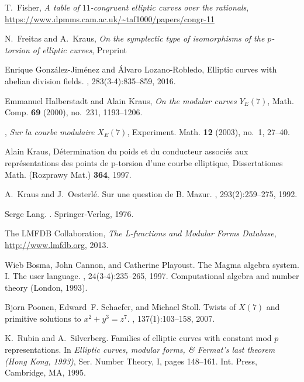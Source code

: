 \documentclass[12pt]{amsart}
\numberwithin{equation}{section}
\theoremstyle{definition}
\theoremstyle{remark}
\begin{document}
\begin{thebibliography}{999}
 T.\ Fisher,
{\em A table of $11$-congruent elliptic curves over the rationals}, \\
\url{https://www.dpmms.cam.ac.uk/~taf1000/papers/congr-11}

 N.\ Freitas and A.\ Kraus,
{\em On the symplectic type of isomorphisms of the $p$-torsion of elliptic curves}, Preprint

Enrique Gonz\'{a}lez-Jim\'{e}nez and \'{A}lvaro Lozano-Robledo,
\newblock Elliptic curves with abelian division fields.
, 283(3-4):835--859, 2016.

Emmanuel Halberstadt and Alain Kraus, \emph{On the modular curves {$Y_E(7)$}},
  Math. Comp. \textbf{69} (2000), no.~231, 1193--1206. 

\bysame, \emph{Sur la courbe modulaire {$X_E(7)$}}, Experiment. Math.
  {\bf 12} (2003), no.~1, 27--40. 
  
Alain Kraus,
\newblock D{\'e}termination du poids et du conducteur associ{\'e}s aux repr{\'e}sentations des points de p-torsion d'une courbe elliptique,
\newblock Dissertationes Math. (Rozprawy Mat.) {\bf 364}, 1997.


A.~Kraus and J.~Oesterl\'{e}.
\newblock Sur une question de {B}. {M}azur.
, 293(2):259--275, 1992.

Serge Lang.
.
\newblock Springer-Verlag, 1976.

 The {LMFDB Collaboration},
{\em The L-functions and Modular Forms Database}, \\
\url{http://www.lmfdb.org}, 2013.

Wieb Bosma, John Cannon, and Catherine Playoust.
\newblock The {M}agma algebra system. {I}. {T}he user language.
, 24(3-4):235--265, 1997.
\newblock Computational algebra and number theory (London, 1993).

Bjorn Poonen, Edward~F. Schaefer, and Michael Stoll.
\newblock Twists of {$X(7)$} and primitive solutions to {$x^2+y^3=z^7$}.
, 137(1):103--158, 2007.


K.~Rubin and A.~Silverberg.
\newblock Families of elliptic curves with constant mod {$p$} representations.
\newblock In {\em Elliptic curves, modular forms, \& {F}ermat's last theorem
  ({H}ong {K}ong, 1993)}, Ser. Number Theory, I, pages 148--161. Int. Press,
  Cambridge, MA, 1995.


\end{thebibliography}
\end{document}

